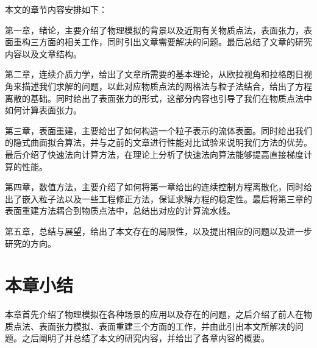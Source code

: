 本文的章节内容安排如下：

    第一章，绪论，主要介绍了物理模拟的背景以及近期有关物质点法，表面张力，表面重构三方面的相关工作，同时引出文章需要解决的问题。最后总结了文章的研究内容以及文章结构。

    第二章，连续介质力学，给出了文章所需要的基本理论，从欧拉视角和拉格朗日视角来描述我们求解的问题，以此对应物质点法的网格法与粒子法结合，给出了方程离散的基础。同时给出了表面张力的形式，这部分内容也引导了我们在物质点法中如何计算表面张力。

    第三章，表面重建，主要给出了如何构造一个粒子表示的流体表面。同时给出我们的隐式曲面拟合算法，并与之前的文章进行性能对比试验来说明我们方法的优势。最后介绍了快速法向计算方法，在理论上分析了快速法向算法能够提高直接梯度计算的性能。

    第四章，数值方法，主要介绍了如何将第一章给出的连续控制方程离散化，同时给出了嵌入粒子法以及一些工程修正方法，保证求解方程的稳定性。最后将第三章的表面重建方法耦合到物质点法中，总结出对应的计算流水线。

    第五章，总结与展望，给出了本文存在的局限性，以及提出相应的问题以及进一步研究的方向。
\section{本章小结}
本章首先介绍了物理模拟在各种场景的应用以及存在的问题，之后介绍了前人在物质点法、表面张力模拟、表面重建三个方面的工作，并由此引出本文所解决的问题。之后阐明了并总结了本文的研究内容，并给出了各章内容的概要。

